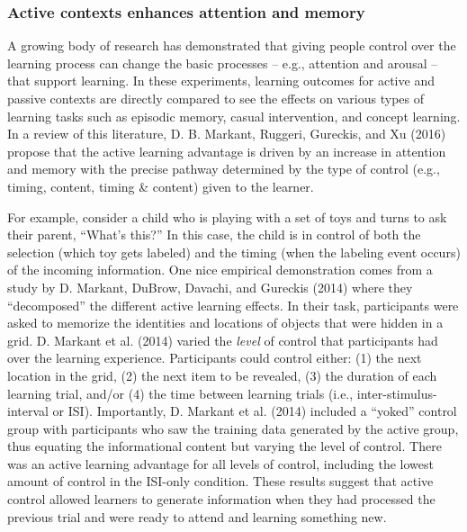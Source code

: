 \documentclass[english,floatsintext,man]{apa6}
\theoremstyle{definition}
\theoremstyle{definition}
\theoremstyle{definition}
\theoremstyle{remark}
\begin{document}
\subsubsection{Active contexts enhances attention and
memory}\label{active-contexts-enhances-attention-and-memory}

A growing body of research has demonstrated that giving people control
over the learning process can change the basic processes -- e.g.,
attention and arousal -- that support learning. In these experiments,
learning outcomes for active and passive contexts are directly compared
to see the effects on various types of learning tasks such as episodic
memory, casual intervention, and concept learning. In a review of this
literature, D. B. Markant, Ruggeri, Gureckis, and Xu (2016) propose that
the active learning advantage is driven by an increase in attention and
memory with the precise pathway determined by the type of control (e.g.,
timing, content, timing \& content) given to the learner.

For example, consider a child who is playing with a set of toys and
turns to ask their parent, \enquote{What's this?} In this case, the
child is in control of both the selection (which toy gets labeled) and
the timing (when the labeling event occurs) of the incoming information.
One nice empirical demonstration comes from a study by D. Markant,
DuBrow, Davachi, and Gureckis (2014) where they \enquote{decomposed} the
different active learning effects. In their task, participants were
asked to memorize the identities and locations of objects that were
hidden in a grid. D. Markant et al. (2014) varied the \emph{level} of
control that participants had over the learning experience. Participants
could control either: (1) the next location in the grid, (2) the next
item to be revealed, (3) the duration of each learning trial, and/or (4)
the time between learning trials (i.e., inter-stimulus-interval or ISI).
Importantly, D. Markant et al. (2014) included a \enquote{yoked} control
group with participants who saw the training data generated by the
active group, thus equating the informational content but varying the
level of control. There was an active learning advantage for all levels
of control, including the lowest amount of control in the ISI-only
condition. These results suggest that active control allowed learners to
generate information when they had processed the previous trial and were
ready to attend and learning something new.
\end{document}
